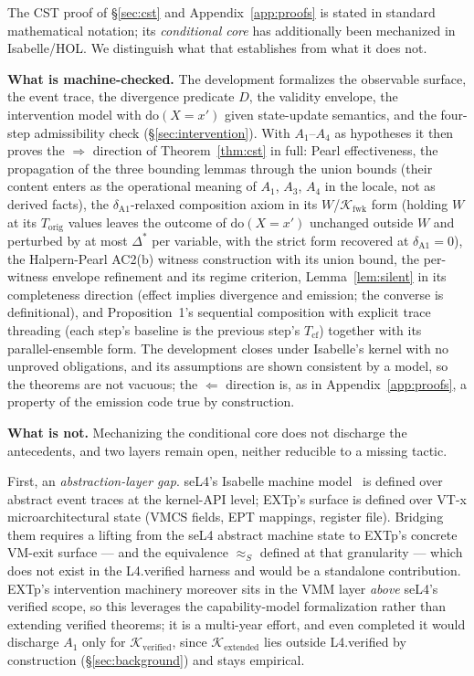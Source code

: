 \documentclass[conference]{IEEEtran}
\newcommand{\Korig}{T_\text{orig}}
\newcommand{\Tcf}{T_\text{cf}}
\newcommand{\Kverified}{\mathcal{K}_\text{verified}}
\newcommand{\Kextended}{\mathcal{K}_\text{extended}}
\newcommand{\Kfwk}{\mathcal{K}_\text{fwk}}
\newcommand{\Dstar}{\Delta^{*}}
\newcommand{\dox}[1]{\text{do}(X{=}#1)}
\begin{document}
The CST proof of \S\ref{sec:cst} and Appendix~\ref{app:proofs} is
stated in standard mathematical notation; its \emph{conditional
core} has additionally been mechanized in Isabelle/HOL. We
distinguish what that establishes from what it does not.

\textbf{What is machine-checked.} The development formalizes the
observable surface, the event trace, the divergence predicate $D$,
the validity envelope, the intervention model with $\dox{x'}$ given
state-update semantics, and the four-step admissibility check
(\S\ref{sec:intervention}). With $A_1$--$A_4$ as hypotheses it then
proves the $\Rightarrow$ direction of Theorem~\ref{thm:cst} in
full: Pearl effectiveness, the propagation of the three bounding
lemmas through the union bounds (their content enters as the
operational meaning of $A_1$, $A_3$, $A_4$ in the locale, not as
derived facts), the $\delta_{\text{A1}}$-relaxed composition axiom
in its $W$/$\Kfwk$ form (holding $W$ at its $\Korig$ values leaves
the outcome of $\dox{x'}$ unchanged outside $W$ and perturbed by at
most $\Dstar$ per variable, with the strict form recovered at
$\delta_{\text{A1}}{=}0$), the Halpern-Pearl AC2(b) witness
construction with its union bound, the per-witness envelope
refinement and its regime criterion, Lemma~\ref{lem:silent} in its
completeness direction (effect implies divergence and emission; the
converse is definitional), and Proposition~1's sequential
composition with explicit trace threading (each step's baseline is
the previous step's $\Tcf$) together with its parallel-ensemble
form. The development
closes under Isabelle's kernel with no unproved obligations, and
its assumptions are shown consistent by a model, so the theorems
are not vacuous; the $\Leftarrow$ direction is, as in
Appendix~\ref{app:proofs}, a property of the emission code true by
construction.

\textbf{What is not.} Mechanizing the conditional core does not
discharge the antecedents, and two layers remain open, neither
reducible to a missing tactic.

First, an \emph{abstraction-layer gap}. seL4's Isabelle machine
model~\cite{klein2014sel4} is defined over abstract event traces at
the kernel-API level; EXTp's surface is defined over VT-x
microarchitectural state (VMCS fields, EPT mappings, register
file). Bridging them requires a lifting from the seL4 abstract
machine state to EXTp's concrete VM-exit surface --- and the
equivalence $\approx_S$ defined at that granularity --- which does
not exist in the L4.verified harness and would be a standalone
contribution. EXTp's intervention machinery moreover sits in the
VMM layer \emph{above} seL4's verified scope, so this leverages the
capability-model formalization rather than extending verified
theorems; it is a multi-year effort, and even completed it would
discharge $A_1$ only for $\Kverified$, since $\Kextended$ lies
outside L4.verified by construction (\S\ref{sec:background}) and
stays empirical.
\end{document}

